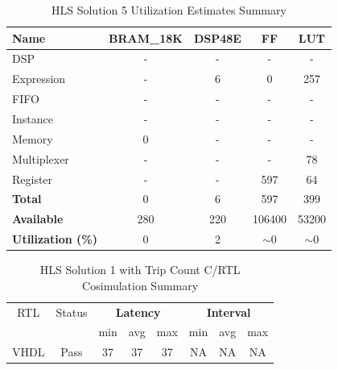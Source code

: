 \begin{table}[h]
	\centering
	\begin{tabular}{|l|c|c|c|c|}
		\hline
		\textbf{Name}    & \textbf{BRAM\_18K} & \textbf{DSP48E} & \textbf{FF} & \textbf{LUT} \\ \hline
		DSP              & -                   & -               & -           & -            \\ 
		Expression       & -                   & 6              & 0           & 257          \\ 
		FIFO             & -                   & -               & -           & -            \\ 
		Instance         & -                   & -               & -           & -            \\ 
		Memory           & 0                   & -               & -          & -            \\ 
		Multiplexer      & -                   & -               & -           & 78          \\ 
		Register         & -                   & -               & 597         & 64            \\ \hline
		\textbf{Total}   & 0                   & 6               & 597         & 399          \\ \hline
		\textbf{Available} & 280               & 220             & 106400      & 53200        \\ \hline
		\textbf{Utilization (\%)} & 0            & 2               & $\sim$0     & $\sim$0      \\ \hline
	\end{tabular}
	\caption{HLS Solution 5 Utilization Estimates Summary}
	\label{tab:hls-solution-5-utilization-estimates-summary}
\end{table}

\begin{table}[H]
	\centering
	\begin{tabular}{|c|c|c|c|c|c|c|c|}
		\hline
		\multicolumn{1}{|c|}{RTL} & \multicolumn{1}{|c|}{Status} & \multicolumn{3}{c|}{\textbf{Latency}} & \multicolumn{3}{c|}{\textbf{Interval}} \\
		&  & min & avg & max & min & avg & max \\
		\hline
		VHDL & Pass & 37 & 37 & 37 & NA & NA & NA \\
		\hline
	\end{tabular}
	\caption{HLS Solution 1 with Trip Count C/RTL Cosimulation Summary }
	\label{tab:hls-solution-1-cosimulation-summary}
\end{table}

